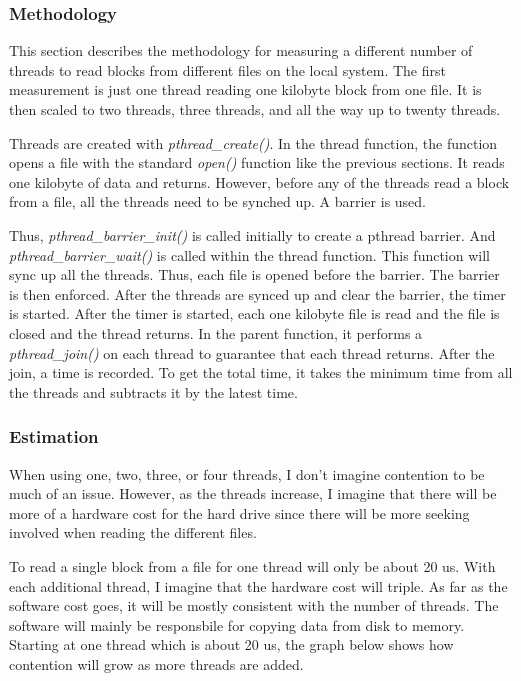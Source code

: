 \documentclass[paper=a4, fontsize=11pt]{scrartcl}
\numberwithin{equation}{section}        %
\numberwithin{figure}{section}          %
\numberwithin{table}{section}               %
\begin{document}
\subsubsection{Methodology}

This section describes the methodology for measuring a different number of threads to read blocks from different files on the local system.  The first measurement is just one thread reading one kilobyte block from one file.  It is then scaled to two threads, three threads, and all the way up to twenty threads.

Threads are created with \textit{pthread\_create()}.  In the thread function, the function opens a file with the standard \textit{open()} function like the previous sections.  It reads one kilobyte of data and returns.  However, before any of the threads read a block from a file, all the threads need to be synched up.  A barrier is used.  

Thus, \textit{pthread\_barrier\_init()} is called initially to create a pthread barrier.  And \textit{pthread\_barrier\_wait()} is called within the thread function.  This function will sync up all the threads.  Thus, each file is opened before the barrier.  The barrier is then enforced.  After the threads are synced up and clear the barrier, the timer is started.  After the timer is started, each one kilobyte file is read and the file is closed and the thread returns.  In the parent function, it performs a \textit{pthread\_join()} on each thread to guarantee that each thread returns.  After the join, a time is recorded.  To get the total time, it takes the minimum time from all the threads and subtracts it by the latest time.

\subsubsection{Estimation}

When using one, two, three, or four threads, I don't imagine contention to be much of an issue.  However, as the threads increase, I imagine that there will be more of a hardware cost for the hard drive since there will be more seeking involved when reading the different files.

To read a single block from a file for one thread will only be about 20 us.  With each additional thread, I imagine that the hardware cost will triple.  As far as the software cost goes, it will be mostly consistent with the number of threads.  The software will mainly be responsbile for copying data from disk to memory.  Starting at one thread which is about 20 us, the graph below shows how contention will grow as more threads are added.
\end{document}
